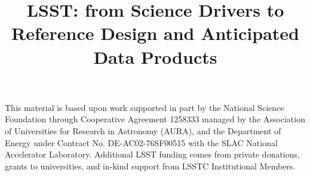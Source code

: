 \documentclass[twocolumn]{aastex62}
\begin{document}
\title{LSST: from Science Drivers to Reference Design and Anticipated Data Products}













\acknowledgments
This material is based upon work supported in part by the National Science Foundation
through Cooperative Agreement 1258333 managed by the Association of Universities for
Research in Astronomy (AURA), and the Department of Energy under Contract No.
DE-AC02-76SF00515 with the SLAC National Accelerator Laboratory. Additional LSST
funding comes from private donations, grants to universities, and in-kind support from
LSSTC Institutional Members.




\end{document}
